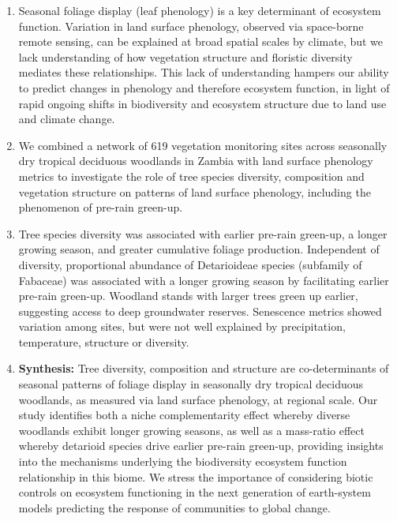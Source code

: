 \documentclass[11pt,a4paper]{article}
\begin{document}
\begin{enumerate}
	\item{Seasonal foliage display (leaf phenology) is a key determinant of
			ecosystem function. Variation in land surface phenology, observed
			via space-borne remote sensing, can be explained at broad spatial
			scales by climate, but we lack understanding of how vegetation
			structure and floristic diversity mediates these relationships.
			This lack of understanding hampers our ability to predict changes
			in phenology and therefore ecosystem function, in light of rapid
			ongoing shifts in biodiversity and ecosystem structure due to land
			use and climate change.}
		
	\item{We combined a network of 619 vegetation monitoring sites across
			seasonally dry tropical deciduous woodlands in Zambia with land
			surface phenology metrics to investigate the role of tree species
			diversity, composition and vegetation structure on patterns of land
			surface phenology, including the phenomenon of pre-rain green-up.} 

	\item{Tree species diversity was associated with earlier pre-rain green-up,
			a longer growing season, and greater cumulative foliage production.
			Independent of diversity, proportional abundance of Detarioideae
			species (subfamily of Fabaceae) was associated with a longer
			growing season by facilitating earlier pre-rain green-up. Woodland
			stands with larger trees green up earlier, suggesting access to
			deep groundwater reserves. Senescence metrics showed variation
			among sites, but were not well explained by precipitation,
			temperature, structure or diversity.}

	\item{\textbf{Synthesis:} Tree diversity, composition and structure are
			co-determinants of seasonal patterns of foliage display in
			seasonally dry tropical deciduous woodlands, as measured via land
			surface phenology, at regional scale. Our study identifies both a
			niche complementarity effect whereby diverse woodlands exhibit
			longer growing seasons, as well as a mass-ratio effect whereby
			detarioid species drive earlier pre-rain green-up, providing
			insights into the mechanisms underlying the biodiversity ecosystem
			function relationship in this biome. We stress the importance of
			considering biotic controls on ecosystem functioning in the next
			generation of earth-system models predicting the response of
		    communities to global change.}

\end{enumerate}
\end{document}
